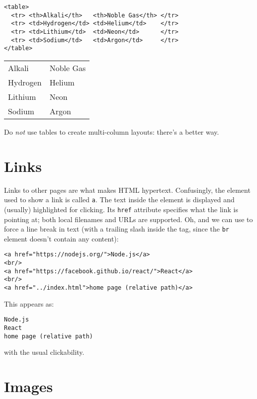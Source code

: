 \begin{verbatim}
<table>
  <tr> <th>Alkali</th>   <th>Noble Gas</th> </tr>
  <tr> <td>Hydrogen</td> <td>Helium</td>    </tr>
  <tr> <td>Lithium</td>  <td>Neon</td>      </tr>
  <tr> <td>Sodium</td>   <td>Argon</td>     </tr>
</table>
\end{verbatim}

\begin{longtable}{ll}
Alkali & Noble Gas \\
Hydrogen & Helium \\
Lithium & Neon \\
Sodium & Argon \\
\end{longtable}

\noindent
Do \emph{not} use tables to create multi-column layouts:
there's a better way.

\section{Links}\label{s:htmlcss-links}

Links to other pages are what makes HTML hypertext.
Confusingly,
the element used to show a link is called \texttt{a}.
The text inside the element is displayed and (usually) highlighted for clicking.
Its \texttt{href} attribute specifies what the link is pointing at;
both local filenames and URLs are supported.
Oh,
and we can use \texttt{} to force a line break in text
(with a trailing slash inside the tag, since the \texttt{br} element doesn't contain any content):

\begin{verbatim}
<a href="https://nodejs.org/">Node.js</a>
<br/>
<a href="https://facebook.github.io/react/">React</a>
<br/>
<a href="../index.html">home page (relative path)</a>
\end{verbatim}

\noindent
This appears as:

\begin{verbatim}
Node.js
React
home page (relative path)
\end{verbatim}

\noindent
with the usual clickability.


\section{Images}\label{s:htmlcss-images}

